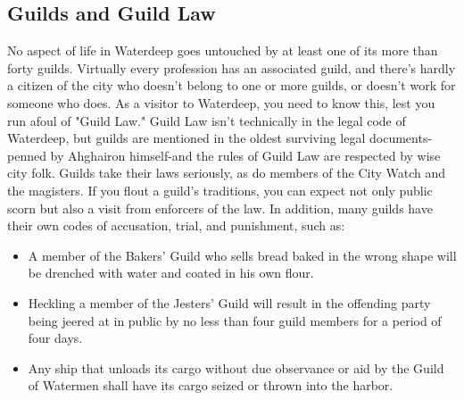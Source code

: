 \documentclass[10pt,a4paper,twoside,twocolumn,openany,nodeprecatedcode]{dndbook}
\begin{document}
\subsection{Guilds and Guild Law}
No aspect of life in Waterdeep goes untouched by at least one of its more than forty guilds. Virtually every profession has an associated guild, and there's hardly a citizen of the city who doesn't belong to one or more guilds, or doesn't work for someone who does. As a visitor to Waterdeep, you need to know this, lest you run afoul of "Guild Law." Guild Law isn't technically in the legal code of Waterdeep, but guilds are mentioned in the oldest surviving legal documents-penned by Ahghairon himself-and the rules of Guild Law are respected by wise city folk.
Guilds take their laws seriously, as do members of the City Watch and the magisters. If you flout a guild's traditions, you can expect not only public scorn but also a visit from enforcers of the law. In addition, many guilds have their own codes of accusation, trial, and punishment, such as:
\begin{itemize}

\item A member of the Bakers' Guild who sells bread baked in the wrong shape will be drenched with water and coated in his own flour.
\item Heckling a member of the Jesters' Guild will result in the offending party being jeered at in public by no less than four guild members for a period of four days.
\item Any ship that unloads its cargo without due observance or aid by the Guild of Watermen shall have its cargo seized or thrown into the harbor.
\end{itemize}
\end{document}

